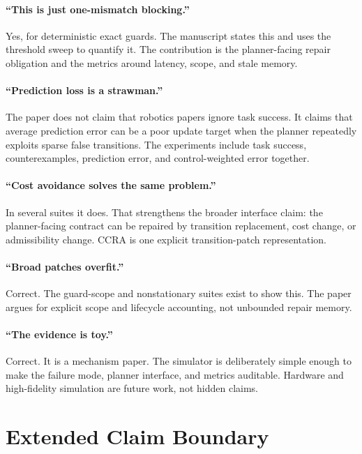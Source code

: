 \documentclass{article}
\begin{document}
\paragraph{``This is just one-mismatch blocking.''}
Yes, for deterministic exact guards. The manuscript states this and uses the threshold sweep to quantify it. The contribution is the planner-facing repair obligation and the metrics around latency, scope, and stale memory.

\paragraph{``Prediction loss is a strawman.''}
The paper does not claim that robotics papers ignore task success. It claims that average prediction error can be a poor update target when the planner repeatedly exploits sparse false transitions. The experiments include task success, counterexamples, prediction error, and control-weighted error together.

\paragraph{``Cost avoidance solves the same problem.''}
In several suites it does. That strengthens the broader interface claim: the planner-facing contract can be repaired by transition replacement, cost change, or admissibility change. CCRA is one explicit transition-patch representation.

\paragraph{``Broad patches overfit.''}
Correct. The guard-scope and nonstationary suites exist to show this. The paper argues for explicit scope and lifecycle accounting, not unbounded repair memory.

\paragraph{``The evidence is toy.''}
Correct. It is a mechanism paper. The simulator is deliberately simple enough to make the failure mode, planner interface, and metrics auditable. Hardware and high-fidelity simulation are future work, not hidden claims.

\section{Extended Claim Boundary}
\end{document}

